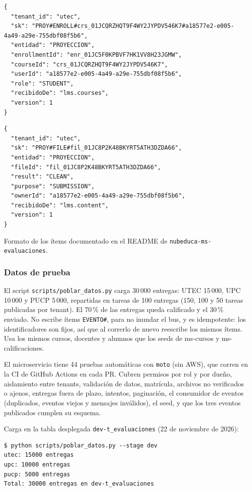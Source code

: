 \begin{lstlisting}
{
  "tenant_id": "utec",
  "sk": "PROY#ENROLL#crs_01JCQRZHQT9F4WY2JYPDV546K7#a18577e2-e005-4a49-a29e-755dbf08f5b6",
  "entidad": "PROYECCION",
  "enrollmentId": "enr_01JC5F0KPBVF7HK1VV8H23JGMW",
  "courseId": "crs_01JCQRZHQT9F4WY2JYPDV546K7",
  "userId": "a18577e2-e005-4a49-a29e-755dbf08f5b6",
  "role": "STUDENT",
  "recibidoDe": "lms.courses",
  "version": 1
}
\end{lstlisting}

\begin{lstlisting}
{
  "tenant_id": "utec",
  "sk": "PROY#FILE#fil_01JC8P2K48BKYRT5ATH3DZDA66",
  "entidad": "PROYECCION",
  "fileId": "fil_01JC8P2K48BKYRT5ATH3DZDA66",
  "result": "CLEAN",
  "purpose": "SUBMISSION",
  "ownerId": "a18577e2-e005-4a49-a29e-755dbf08f5b6",
  "recibidoDe": "lms.content",
  "version": 1
}
\end{lstlisting}

Formato de los ítems documentado en el README de \texttt{nubeduca-ms-evaluaciones}.

\subsubsection{Datos de prueba}
El script \texttt{scripts/poblar\_datos.py} carga 30\,000 entregas: UTEC 15\,000, UPC 10\,000 y PUCP 5\,000, repartidas en tareas de 100 entregas (150, 100 y 50 tareas publicadas por tenant). El 70\,\% de las entregas queda calificado y el 30\,\% enviado. No escribe ítems \texttt{EVENTO\#}, para no inundar el bus, y es idempotente: los identificadores son fijos, así que al correrlo de nuevo reescribe los mismos ítems. Usa los mismos cursos, docentes y alumnos que los seeds de ms-cursos y ms-calificaciones.

El microservicio tiene 44 pruebas automáticas con \texttt{moto} (sin AWS), que corren en la CI de GitHub Actions en cada PR. Cubren permisos por rol y por dueño, aislamiento entre tenants, validación de datos, matrícula, archivos no verificados o ajenos, entregas fuera de plazo, intentos, paginación, el consumidor de eventos (duplicados, eventos viejos y mensajes inválidos), el seed, y que los tres eventos publicados cumplen su esquema.

Carga en la tabla desplegada \texttt{dev-t\_evaluaciones} (22 de noviembre de 2026):

\begin{lstlisting}
$ python scripts/poblar_datos.py --stage dev
utec: 15000 entregas
upc: 10000 entregas
pucp: 5000 entregas
Total: 30000 entregas en dev-t_evaluaciones
\end{lstlisting}

